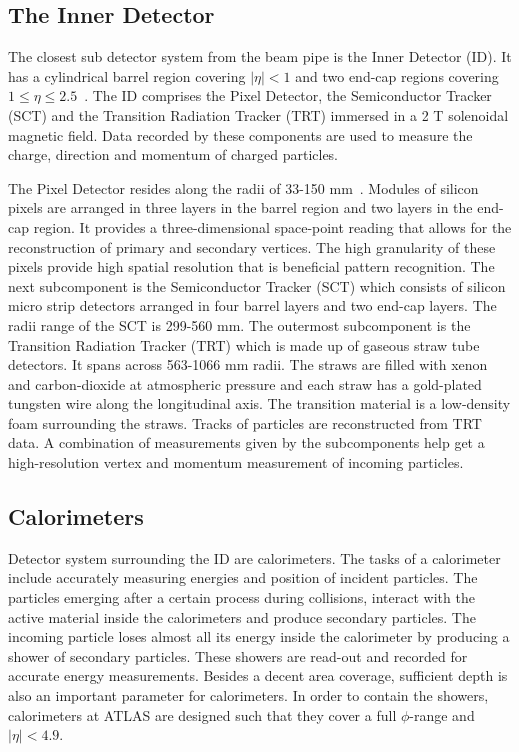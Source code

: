 \subsection{The Inner Detector}
The closest sub detector system from the beam pipe is the Inner Detector (ID). It has a cylindrical 
barrel region covering $|\eta|<1$ and two end-cap regions covering 
$1 \leq \eta \leq 2.5$~\cite{BARBERIS2000331}. The ID comprises the Pixel Detector, the Semiconductor 
Tracker (SCT) and the Transition Radiation Tracker (TRT) immersed in a 2 T solenoidal 
magnetic field. Data recorded by these components are used to measure the charge, direction and 
momentum of charged particles.

The Pixel Detector resides along the radii of 33-150 mm~\cite{Aaboud_2017}. Modules of silicon pixels 
are arranged in three layers in the barrel region and two layers in the end-cap region. 
It provides a three-dimensional space-point reading that allows for the reconstruction of primary and 
secondary vertices. The high granularity of these pixels provide high spatial 
resolution that is beneficial pattern recognition. The next subcomponent is the Semiconductor 
Tracker (SCT) which consists of silicon micro strip detectors 
arranged in four barrel layers and two end-cap layers. The radii range of the SCT is 299-560 mm. The 
outermost subcomponent is the Transition Radiation Tracker (TRT) which 
is made up of gaseous straw tube detectors. It spans across 563-1066 mm radii. The straws are filled 
with xenon and carbon-dioxide at atmospheric pressure and each straw
has a gold-plated tungsten wire along the longitudinal axis. The transition material is a low-density 
foam surrounding the straws. Tracks of particles are reconstructed from TRT
data. A combination of measurements given by the subcomponents help get a high-resolution vertex and 
momentum measurement of incoming particles. 

\subsection{Calorimeters}
Detector system surrounding the ID are calorimeters. The tasks of a calorimeter include accurately measuring energies and position of incident
particles. The particles emerging after a certain process during collisions, interact with the active material inside the calorimeters and produce secondary particles. The incoming
particle loses almost all its energy inside the calorimeter by producing a shower of secondary particles. These showers are read-out and recorded for accurate energy measurements. 
Besides a decent area coverage, sufficient depth is also an important parameter for calorimeters. In order to contain the showers, calorimeters at ATLAS are designed such that they cover a 
full $\phi$-range and $|\eta|<4.9$.  

